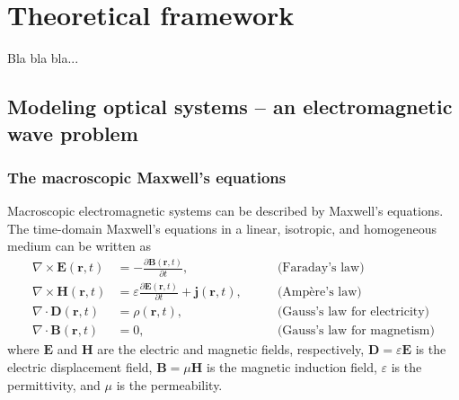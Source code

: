 \chapter{Theoretical framework}

Bla bla bla...






\section{Modeling optical systems -- an electromagnetic wave problem}

\subsection*{The macroscopic Maxwell's equations}

Macroscopic electromagnetic systems can be described by Maxwell's equations. The time-domain Maxwell's equations in a linear, isotropic, and homogeneous medium can be written as
\begin{align}
    \nabla \times \mathbf{E} (\mathbf{r},t) &= - \frac{\partial \mathbf{B}(\mathbf{r},t)}{\partial t}, \quad \quad &\text{(Faraday's law)} \label{eq:curlE_time}\\
    \nabla \times \mathbf{H} (\mathbf{r},t) &= \varepsilon \frac{\partial \mathbf{E}(\mathbf{r},t)}{\partial t} + \mathbf{j}(\mathbf{r},t), \quad \quad &\text{(Ampère's law)} \label{eq:curlH_time}\\
    \nabla \cdot \mathbf{D} (\mathbf{r},t) &= \rho(\mathbf{r},t), \quad \quad &\text{(Gauss's law for electricity)} \label{eq:divD_time}\\
    \nabla \cdot \mathbf{B} (\mathbf{r},t) &= 0, \quad \quad &\text{(Gauss's law for magnetism)} \label{eq:divB_time}
\end{align}
where $\mathbf{E}$ and $\mathbf{H}$ are the electric and magnetic fields, respectively, $\mathbf{D} = \varepsilon \mathbf{E}$ is the electric displacement field, $\mathbf{B} = \mu \mathbf{H}$ is the magnetic induction field, $\varepsilon$ is the permittivity, and $\mu$ is the permeability.

